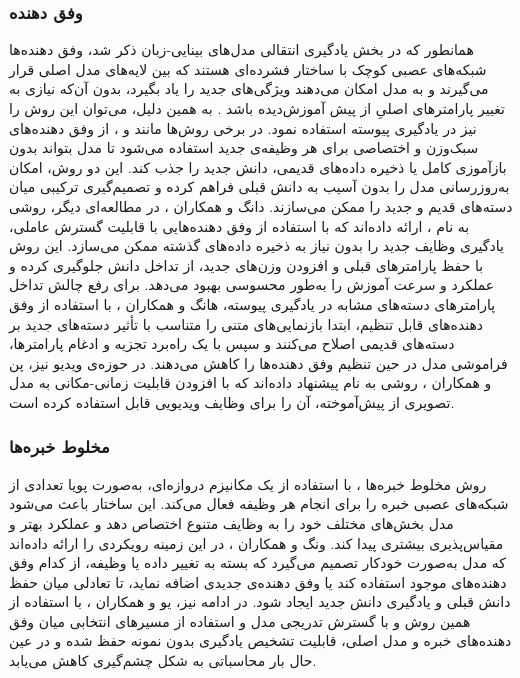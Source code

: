 \subsubsection{وفق دهنده}
همانطور که در بخش یادگیری انتقالی مدل‌های بینایی-زبان ذکر شد، وفق دهنده‌ها شبکه‌های عصبی کوچک با ساختار فشرده‌ای هستند که بین لایه‌های مدل اصلی قرار می‌گیرند و به مدل امکان می‌دهند ویژگی‌های جدید را یاد بگیرد، بدون آن‌که نیازی به تغییر پارامتر‌های اصلیِ از پیش آموزش‌دیده باشد \cite{llm_continual}. به همین دلیل، می‌توان این روش را نیز در یادگیری پیوسته استفاده نمود. در برخی روش‌ها مانند 
\cite{dia-adapter-2025}
و 
\cite{ease-adapter-2024}،
از وفق دهنده‌های سبک‌وزن و اختصاصی برای هر وظیفه‌ی جدید استفاده می‌شود تا مدل بتواند بدون بازآموزی کامل یا ذخیره داده‌های قدیمی، دانش جدید را جذب کند. این دو روش، امکان به‌روزرسانی مدل را بدون آسیب به دانش قبلی فراهم کرده و تصمیم‌گیری ترکیبی میان دسته‌های قدیم و جدید را ممکن می‌سازند. دانگ و همکاران 
\cite{cada-adapter-2025}،
در مطالعه‌ای دیگر، روشی به نام ، ارائه داده‌اند که با استفاده از وفق دهنده‌هایی با قابلیت گسترش عاملی، یادگیری وظایف جدید را بدون نیاز به ذخیره داده‌های گذشته ممکن می‌سازد. این روش با حفظ پارامتر‌های قبلی و افزودن وزن‌های جدید، از تداخل دانش جلوگیری کرده و عملکرد و سرعت آموزش را به‌طور محسوسی بهبود می‌دهد. برای رفع چالش تداخل پارامتر‌های دسته‌های مشابه در یادگیری پیوسته، هانگ و همکاران 
\cite{rapf-adapter-2024}،
با استفاده از وفق دهنده‌های قابل تنظیم، ابتدا بازنمایی‌های متنی را متناسب با تأثیر دسته‌های جدید بر دسته‌های قدیمی اصلاح می‌کنند و سپس با یک راه‌برد تجزیه و ادغام پارامتر‌ها، فراموشی مدل در حین تنظیم وفق دهنده‌ها را کاهش می‌دهند. در حوزه‌ی ویدیو نیز، پن و همکاران 
\cite{st-adapter-2022}،
روشی به نام  پیشنهاد داده‌اند که با افزودن قابلیت زمانی-مکانی به مدل‌ تصویری از پیش‌آموخته، آن را برای وظایف ویدیویی قابل استفاده کرده است. 
 
\subsubsection{مخلوط خبره‌ها}
 روش مخلوط خبره‌ها
،
 با استفاده از یک مکانیزم دروازه‌ای، به‌صورت پویا تعدادی از شبکه‌های عصبی خبره را برای انجام هر وظیفه فعال می‌کند. این ساختار باعث می‌شود مدل بخش‌های مختلف خود را به وظایف متنوع اختصاص دهد و عملکرد بهتر و مقیاس‌پذیری بیشتری پیدا کند. ونگ و همکاران 
\cite{sema-2024}،
در این زمینه رویکردی را ارائه داده‌اند که مدل به‌صورت خودکار تصمیم می‌گیرد که بسته به تغییر داده یا وظیفه، از کدام وفق دهنده‌های موجود استفاده کند یا وفق دهنده‌ی جدیدی اضافه نماید، تا تعادلی میان حفظ دانش قبلی و یادگیری دانش جدید ایجاد شود. در ادامه نیز، یو و همکاران 
\cite{ddas-2024}،
با استفاده از همین روش و با گسترش تدریجی مدل  و استفاده از مسیرهای انتخابی میان وفق دهنده‌های خبره و مدل اصلی، قابلیت تشخیص یادگیری بدون نمونه حفظ شده و در عین حال بار محاسباتی به شکل چشم‌گیری کاهش می‌یابد.


